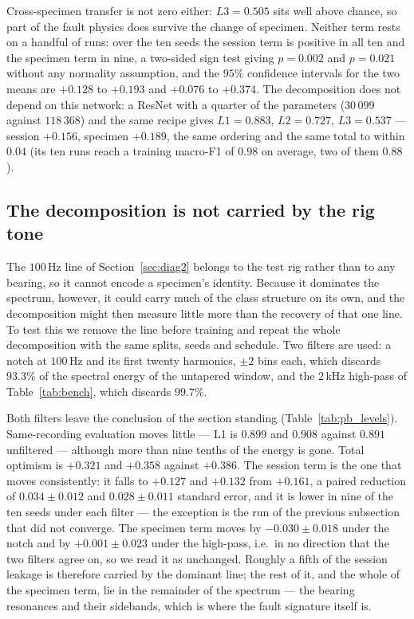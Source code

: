 \documentclass[preprint,12pt]{elsarticle}
\begin{document}
Cross-specimen transfer is not zero either: $L3 = 0.505$ sits well above
chance, so part of the fault physics does
survive the change of specimen. Neither term rests on a handful of runs: over
the ten seeds the session term is positive in all ten and the specimen term in
nine, a two-sided sign test giving $p = 0.002$ and $p = 0.021$ without any
normality assumption, and the $95\%$ confidence intervals for the two means are
$+0.128$ to $+0.193$ and $+0.076$ to $+0.374$. The decomposition does not depend on this network: a ResNet
with a quarter of the parameters ($30\,099$ against $118\,368$) and the same
recipe gives $L1 = 0.883$, $L2 = 0.727$, $L3 = 0.537$ --- session $+0.156$,
specimen $+0.189$, the same ordering and the same total to within $0.04$ (its
ten runs reach a training macro-F1 of $0.98$ on average, two of them $0.88$).

\subsection{The decomposition is not carried by the rig tone}
\label{sec:pb_filter}

The $100$\,Hz line of Section~\ref{sec:diag2} belongs to the test rig rather
than to any bearing, so it cannot encode a specimen's identity. Because it
dominates the spectrum, however, it could carry much of the class structure on
its own, and the decomposition might then measure little more than the recovery
of that one line. To test this we remove the line before training and repeat the
whole decomposition with the same splits, seeds and schedule. Two filters are used: a
notch at $100$\,Hz and its first twenty harmonics, $\pm2$ bins each, which
discards $93.3\%$ of the spectral energy of the untapered window, and the
$2$\,kHz high-pass of Table~\ref{tab:bench}, which discards $99.7\%$.

Both filters leave the conclusion of the section standing
(Table~\ref{tab:pb_levels}). Same-recording evaluation moves little --- L1 is
$0.899$ and $0.908$ against $0.891$ unfiltered --- although more than nine
tenths of the energy is gone. Total optimism is $+0.321$ and $+0.358$ against
$+0.386$. The session term is the one that moves consistently: it falls to
$+0.127$ and $+0.132$ from $+0.161$, a paired reduction of $0.034 \pm 0.012$
and $0.028 \pm 0.011$ standard error, and it is lower in nine of the ten seeds
under each filter --- the exception is the run of the previous subsection that
did not converge. The specimen term moves by $-0.030 \pm 0.018$ under the notch
and by $+0.001 \pm 0.023$ under the high-pass, i.e.\ in no direction that the
two filters agree on, so we read it as unchanged. Roughly a fifth of the session
leakage is therefore carried by the dominant line; the rest of it, and the
whole of the specimen term, lie in the remainder of the spectrum --- the bearing
resonances and their sidebands, which is where the fault signature itself is.
\end{document}
